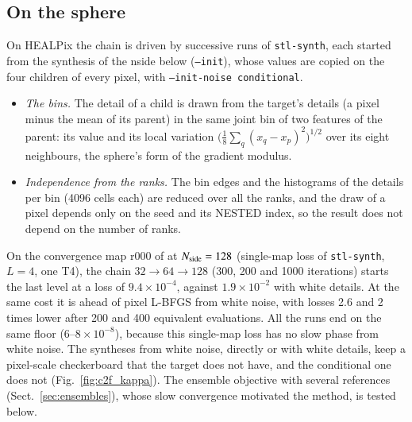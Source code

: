 \subsection{On the sphere}
\label{app:c2f_healpix}

On HEALPix the chain is driven by successive runs of \texttt{stl-synth}, each started from the synthesis of the nside below (\texttt{--init}), whose values are copied on the four children of every pixel, with \texttt{--init-noise conditional}.
\begin{itemize}
\item \emph{The bins.} The detail of a child is drawn from the target's details (a pixel minus the mean of its parent) in the same joint bin of two features of the parent: its value and its local variation $\big(\frac{1}{8}\sum_{q}(x_q-x_p)^2\big)^{1/2}$ over its eight neighbours, the sphere's form of the gradient modulus.
\item \emph{Independence from the ranks.} The bin edges and the histograms of the details per bin (4096 cells each) are reduced over all the ranks, and the draw of a pixel depends only on the seed and its NESTED index, so the result does not depend on the number of ranks.
\end{itemize}

On the convergence map r000 of \citet{takahashi2017} at $N_{\rm side}=128$ (single-map loss of \texttt{stl-synth}, $L=4$, one T4), the chain $32\to64\to128$ (300, 200 and 1000 iterations) starts the last level at a loss of $9.4\times10^{-4}$, against $1.9\times10^{-2}$ with white details. At the same cost it is ahead of pixel L-BFGS from white noise, with losses 2.6 and 2 times lower after 200 and 400 equivalent evaluations. All the runs end on the same floor ($6$--$8\times10^{-8}$), because this single-map loss has no slow phase from white noise. The syntheses from white noise, directly or with white details, keep a pixel-scale checkerboard that the target does not have, and the conditional one does not (Fig.~\ref{fig:c2f_kappa}). The ensemble objective with several references (Sect.~\ref{sec:ensembles}), whose slow convergence motivated the method, is tested below.


